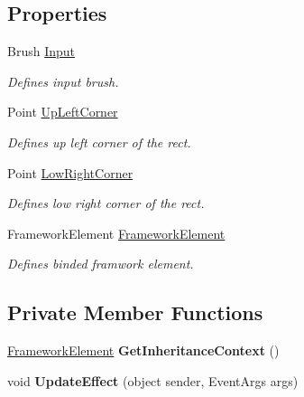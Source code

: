 \subsection*{Properties}
\begin{DoxyCompactItemize}
\item 
Brush \mbox{\hyperlink{class_wpf_handler_1_1_u_i_1_1_effects_1_1_rect_blur_effect_ab0fee53cfe9bd6fd6a3ba991a2c024a3}{Input}}
\begin{DoxyCompactList}\small\item\em Defines input brush. \end{DoxyCompactList}\item 
Point \mbox{\hyperlink{class_wpf_handler_1_1_u_i_1_1_effects_1_1_rect_blur_effect_a7a8ff424f98797d72aa8acea72f45b89}{Up\+Left\+Corner}}
\begin{DoxyCompactList}\small\item\em Defines up left corner of the rect. \end{DoxyCompactList}\item 
Point \mbox{\hyperlink{class_wpf_handler_1_1_u_i_1_1_effects_1_1_rect_blur_effect_ab96f47536e8fe94f27c24072d1f462a5}{Low\+Right\+Corner}}
\begin{DoxyCompactList}\small\item\em Defines low right corner of the rect. \end{DoxyCompactList}\item 
Framework\+Element \mbox{\hyperlink{class_wpf_handler_1_1_u_i_1_1_effects_1_1_rect_blur_effect_a16fb661a9b5f9f2c7a59eba0bca46198}{Framework\+Element}}
\begin{DoxyCompactList}\small\item\em Defines binded framwork element. \end{DoxyCompactList}\end{DoxyCompactItemize}
\subsection*{Private Member Functions}
\begin{DoxyCompactItemize}
\item 
\mbox{\label{class_wpf_handler_1_1_u_i_1_1_effects_1_1_rect_blur_effect_aa60afd4d911b66bd47a6bbd8df16689a}} 
\mbox{\hyperlink{class_wpf_handler_1_1_u_i_1_1_effects_1_1_rect_blur_effect_a16fb661a9b5f9f2c7a59eba0bca46198}{Framework\+Element}} {\bfseries Get\+Inheritance\+Context} ()
\item 
\mbox{\label{class_wpf_handler_1_1_u_i_1_1_effects_1_1_rect_blur_effect_a15ff012163044834cdf634a2282ab6ec}} 
void {\bfseries Update\+Effect} (object sender, Event\+Args args)
\end{DoxyCompactItemize}
